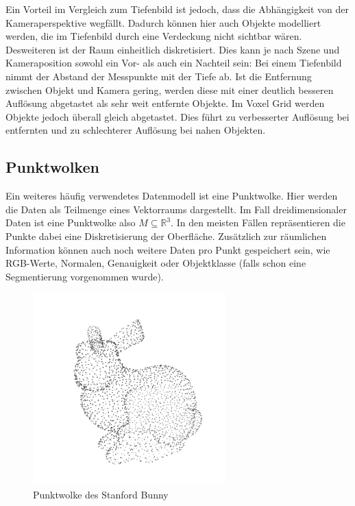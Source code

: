 Ein Vorteil im Vergleich zum Tiefenbild ist jedoch, dass die Abhängigkeit von der Kameraperspektive wegfällt.
Dadurch können hier auch Objekte modelliert werden, die im Tiefenbild durch eine Verdeckung nicht sichtbar wären.
Desweiteren ist der Raum einheitlich diskretisiert.
Dies kann je nach Szene und Kameraposition sowohl ein Vor- als auch ein Nachteil sein:
Bei einem Tiefenbild nimmt der Abstand der Messpunkte mit der Tiefe ab.
Ist die Entfernung zwischen Objekt und Kamera gering, werden diese mit einer deutlich besseren Auflösung abgetastet als sehr weit entfernte Objekte.
Im Voxel Grid werden Objekte jedoch überall gleich abgetastet.
Dies führt zu verbesserter Auflösung bei entfernten und zu schlechterer Auflösung bei nahen Objekten.


\subsection{Punktwolken}
\label{subsec:punktwolken}

Ein weiteres häufig verwendetes Datenmodell ist eine Punktwolke.
Hier werden die Daten als Teilmenge eines Vektorraums dargestellt.
Im Fall dreidimensionaler Daten ist eine Punktwolke also $M \subseteq \mathbb{R}^3$.
In den meisten Fällen repräsentieren die Punkte dabei eine Diskretisierung der Oberfläche.
Zusätzlich zur räumlichen Information können auch noch weitere Daten pro Punkt gespeichert sein, wie RGB-Werte, Normalen, Genauigkeit oder Objektklasse (falls schon eine Segmentierung vorgenommen wurde).

\begin{figure}[ht]
	\centering
	\includegraphics[width=0.66\textwidth, frame]{images/bunny_pcd.png}
	\caption{Punktwolke des Stanford Bunny \cite{stanfordbunny}}
	\label{fig:bunny_pcd}
\end{figure}


